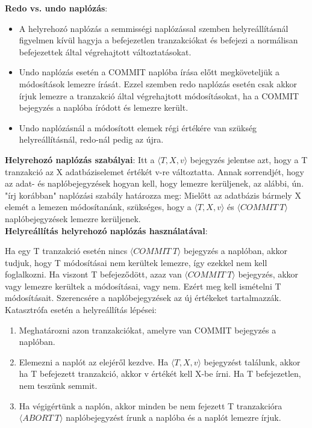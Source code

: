 \documentclass[margin=0px]{article}
\begin{document}
\noindent \textbf{Redo vs. undo naplózás}:
\begin{itemize}
    \item	A helyrehozó naplózás a semmisségi naplózással szemben helyreállításnál figyelmen kívül hagyja a befejezetlen
          tranzakciókat és befejezi a normálisan befejezettek által végrehajtott változtatásokat.

    \item	Undo naplózás esetén a COMMIT naplóba írása előtt megköveteljük a módosítások lemezre írását. Ezzel szemben
          redo naplózás esetén csak akkor írjuk lemezre a tranzakció által végrehajtott módosításokat, ha a COMMIT bejegyzés
          a naplóba íródott és lemezre került.

    \item	Undo naplózásnál a módosított elemek régi értékére van szükség helyreállításnál, redo-nál pedig az újra.
\end{itemize}

\noindent \textbf{Helyrehozó naplózás szabályai}:
Itt a $\langle T,X,v\rangle$ bejegyzés jelentse azt, hogy a T tranzakció az X adatbáziselemet értékét v-re változtatta.
Annak sorrendjét, hogy az adat- és naplóbejegyzések hogyan kell, hogy lemezre kerüljenek, az alábbi, ún. "írj korábban"
naplózási szabály határozza meg: Mielőtt az adatbázis bármely X elemét a lemezen módosítanánk, szükséges, hogy
a $\langle T,X,v\rangle$ és $\langle COMMIT \ T\rangle$ naplóbejegyzések lemezre kerüljenek.\\

\noindent \textbf{Helyreállítás helyrehozó naplózás használatával}:

Ha egy T tranzakció esetén nincs $\langle COMMIT \ T\rangle$ bejegyzés a naplóban, akkor tudjuk, hogy T módosításai
nem kerültek lemezre, így ezekkel nem kell foglalkozni. Ha viszont T befejeződött, azaz van $\langle COMMIT \ T\rangle$
bejegyzés, akkor vagy lemezre kerültek a módosításai, vagy nem. Ezért meg kell ismételni T módosításait. Szerencsére
a naplóbejegyzések az új értékeket tartalmazzák.\\

\noindent Katasztrófa esetén a helyreállítás lépései:
\begin{enumerate}
    \item	Meghatározni azon tranzakciókat, amelyre van COMMIT bejegyzés a naplóban.
    \item	Elemezni a naplót az elejéről kezdve. Ha $\langle T,X,v\rangle$ bejegyzést találunk, akkor
          ha T befejezett tranzakció, akkor v értékét kell X-be írni. Ha T befejezetlen, nem teszünk semmit.
    \item	Ha végigértünk a naplón, akkor minden be nem fejezett T tranzakcióra $\langle ABORT \ T\rangle$
          naplóbejegyzést írunk a naplóba és a naplót lemezre írjuk.
\end{enumerate}
\end{document}

